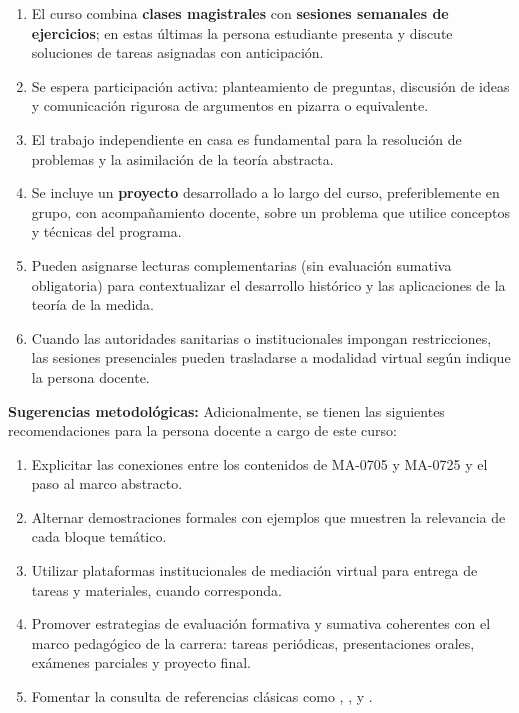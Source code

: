 \begin{refsection}
\begin{enumerate}
    \item El curso combina \textbf{clases magistrales} con \textbf{sesiones semanales de ejercicios}; en estas últimas la persona estudiante presenta y discute soluciones de tareas asignadas con anticipación.
    \item Se espera participación activa: planteamiento de preguntas, discusión de ideas y comunicación rigurosa de argumentos en pizarra o equivalente.
    \item El trabajo independiente en casa es fundamental para la resolución de problemas y la asimilación de la teoría abstracta.
    \item Se incluye un \textbf{proyecto} desarrollado a lo largo del curso, preferiblemente en grupo, con acompañamiento docente, sobre un problema que utilice conceptos y técnicas del programa.
    \item Pueden asignarse lecturas complementarias (sin evaluación sumativa obligatoria) para contextualizar el desarrollo histórico y las aplicaciones de la teoría de la medida.
    \item Cuando las autoridades sanitarias o institucionales impongan restricciones, las sesiones presenciales pueden trasladarse a modalidad virtual según indique la persona docente.
\end{enumerate}

\textbf{Sugerencias metodológicas:} Adicionalmente, se tienen las siguientes recomendaciones para la persona docente a cargo de este curso:

\begin{enumerate}
    \item Explicitar las conexiones entre los contenidos de MA-0705 y MA-0725 y el paso al marco abstracto.
    \item Alternar demostraciones formales con ejemplos que muestren la relevancia de cada bloque temático.
    \item Utilizar plataformas institucionales de mediación virtual para entrega de tareas y materiales, cuando corresponda.
    \item Promover estrategias de evaluación formativa y sumativa coherentes con el marco pedagógico de la carrera: tareas periódicas, presentaciones orales, exámenes parciales y proyecto final.
    \item Fomentar la consulta de referencias clásicas como \cite{Fol99}, \cite{SS05}, \cite{Lie01} y \cite{Vil03}.
\end{enumerate}

\nocite{Bog20}
\nocite{BBT08}
\nocite{Fol99}
\nocite{Lie01}
\nocite{RF10}
\nocite{SS05}
\nocite{Vil03}

\printbibliography[heading=subbibliography,section=\the\value{refsection}]
\end{refsection}
